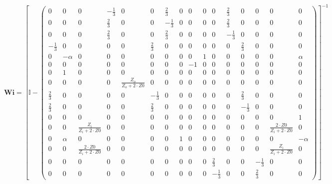 \[ \mathbf{Wi} =  \left[ \mathbb{I}  - \left(\begin{smallmatrix} 0 & 0
& 0 & -\frac{1}{3} & 0 & 0 & \frac{2}{3} & 0 & 0 & 0 & 0 & \frac{2}{3}
& 0 & 0 & 0 & 0 \\ 0 & 0 & 0 & \frac{2}{3} & 0 & 0 & -\frac{1}{3} & 0
& 0 & 0 & 0 & \frac{2}{3} & 0 & 0 & 0 & 0 \\ 0 & 0 & 0 & \frac{2}{3} &
0 & 0 & \frac{2}{3} & 0 & 0 & 0 & 0 & -\frac{1}{3} & 0 & 0 & 0 & 0 \\
-\frac{1}{3} & 0 & 0 & 0 & 0 & \frac{2}{3} & 0 & 0 & 0 & 0 & 0 & 0 &
\frac{2}{3} & 0 & 0 & 0 \\ 0 & -\alpha & 0 & 0 & 0 & 0 & 0 & 0 & 0 & 1
& 0 & 0 & 0 & 0 & 0 & \alpha \\ 0 & 0 & 0 & 0 & 0 & 0 & 0 & 0 & -1 & 0
& 0 & 0 & 0 & 0 & 0 & 0 \\ 0 & 1 & 0 & 0 & 0 & 0 & 0 & 0 & 0 & 0 & 0 &
0 & 0 & 0 & 0 & 0 \\ 0 & 0 & 0 & 0 & \frac{Z_o}{Z_o+2\cdot Z0} & 0 & 0
& 0 & 0 & 0 & 0 & 0 & 0 & 0 & 0 & 0 \\ \frac{2}{3} & 0 & 0 & 0 & 0 &
-\frac{1}{3} & 0 & 0 & 0 & 0 & 0 & 0 & \frac{2}{3} & 0 & 0 & 0 \\
\frac{2}{3} & 0 & 0 & 0 & 0 & \frac{2}{3} & 0 & 0 & 0 & 0 & 0 & 0 &
-\frac{1}{3} & 0 & 0 & 0 \\ 0 & 0 & 0 & 0 & 0 & 0 & 0 & 0 & 0 & 0 & 0
& 0 & 0 & 0 & 0 & 1 \\ 0 & 0 & \frac{Z_i}{Z_i+2\cdot Z0} & 0 & 0 & 0 &
0 & 0 & 0 & 0 & 0 & 0 & 0 & 0 & \frac{2\cdot Z0}{Z_i+2\cdot Z0} & 0 \\
0 & \alpha & 0 & 0 & 0 & 0 & 0 & 1 & 0 & 0 & 0 & 0 & 0 & 0 & 0 &
-\alpha \\ 0 & 0 & \frac{2\cdot Z0}{Z_i+2\cdot Z0} & 0 & 0 & 0 & 0 & 0
& 0 & 0 & 0 & 0 & 0 & 0 & \frac{Z_i}{Z_i+2\cdot Z0} & 0 \\ 0 & 0 & 0 &
0 & 0 & 0 & 0 & 0 & 0 & 0 & \frac{2}{3} & 0 & 0 & -\frac{1}{3} & 0 & 0
\\ 0 & 0 & 0 & 0 & 0 & 0 & 0 & 0 & 0 & 0 & -\frac{1}{3} & 0 & 0 &
\frac{2}{3} & 0 & 0 \end{smallmatrix}\right) \right]^{-1}  \]
